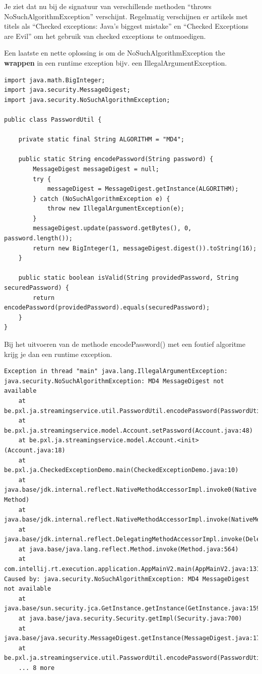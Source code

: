 \begin{itemize}
{Je ziet dat nu bij de signatuur van verschillende methoden ``throws NoSuchAlgorithmException'' verschijnt.
Regelmatig verschijnen er artikels met titels als ``Checked exceptions: Java’s biggest mistake'' en ``Checked Exceptions are Evil'' om het gebruik van checked exceptions te ontmoedigen. 

Een laatste en nette oplossing is om de NoSuchAlgorithmException the \textbf{wrappen}  in een runtime exception bijv. een IllegalArgumentException.

\begin{lstlisting}
import java.math.BigInteger;
import java.security.MessageDigest;
import java.security.NoSuchAlgorithmException;

public class PasswordUtil {

	private static final String ALGORITHM = "MD4";

	public static String encodePassword(String password) {
		MessageDigest messageDigest = null;
		try {
			messageDigest = MessageDigest.getInstance(ALGORITHM);
		} catch (NoSuchAlgorithmException e) {
			throw new IllegalArgumentException(e);
		}
		messageDigest.update(password.getBytes(), 0, password.length());
		return new BigInteger(1, messageDigest.digest()).toString(16);
	}

	public static boolean isValid(String providedPassword, String securedPassword) {
		return encodePassword(providedPassword).equals(securedPassword);
	}
}
\end{lstlisting}

Bij het uitvoeren van de methode encodePassword() met een foutief algoritme krijg je dan een runtime exception.

\begin{verbatim}
Exception in thread "main" java.lang.IllegalArgumentException: java.security.NoSuchAlgorithmException: MD4 MessageDigest not available
	at be.pxl.ja.streamingservice.util.PasswordUtil.encodePassword(PasswordUtil.java:17)
	at be.pxl.ja.streamingservice.model.Account.setPassword(Account.java:48)
	at be.pxl.ja.streamingservice.model.Account.<init>(Account.java:18)
	at be.pxl.ja.CheckedExceptionDemo.main(CheckedExceptionDemo.java:10)
	at java.base/jdk.internal.reflect.NativeMethodAccessorImpl.invoke0(Native Method)
	at java.base/jdk.internal.reflect.NativeMethodAccessorImpl.invoke(NativeMethodAccessorImpl.java:62)
	at java.base/jdk.internal.reflect.DelegatingMethodAccessorImpl.invoke(DelegatingMethodAccessorImpl.java:43)
	at java.base/java.lang.reflect.Method.invoke(Method.java:564)
	at com.intellij.rt.execution.application.AppMainV2.main(AppMainV2.java:131)
Caused by: java.security.NoSuchAlgorithmException: MD4 MessageDigest not available
	at java.base/sun.security.jca.GetInstance.getInstance(GetInstance.java:159)
	at java.base/java.security.Security.getImpl(Security.java:700)
	at java.base/java.security.MessageDigest.getInstance(MessageDigest.java:177)
	at be.pxl.ja.streamingservice.util.PasswordUtil.encodePassword(PasswordUtil.java:15)
	... 8 more
\end{verbatim}

}
\end{itemize}
